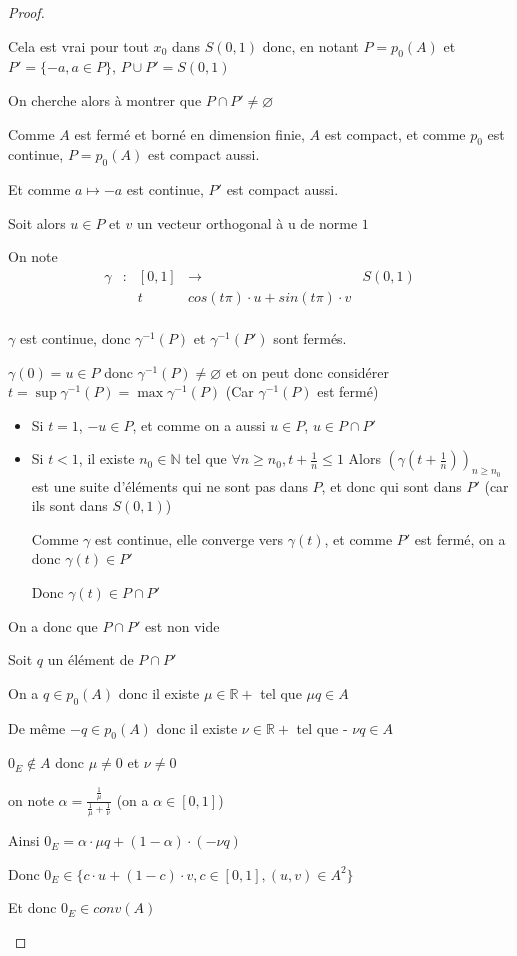 \documentclass[a4paper]{article}
\begin{document}
\begin{proof}
\begin{itemize}
Cela est vrai pour tout $x_{0}$ dans $S(0, 1)$ donc, en notant $P = p_{0}(A)$ et $P' = \{-a, a \in P \}$, $P \cup P' = S(0, 1)$

On cherche alors à montrer que $ P \cap P' \neq \varnothing$

Comme $A$ est fermé et borné en dimension finie, $A$ est compact, et comme $p_{0}$ est continue, $P = p_{0}(A)$ est compact aussi.

Et comme $a \mapsto -a$ est continue, $P'$ est compact aussi.

Soit alors $u \in P$ et $v$ un vecteur orthogonal à u de norme $1$

On note 
\[\begin{array}{ccccc}
\gamma & : & [0, 1] & \to & S(0, 1) \\
 & & t & cos(t\pi) \cdot u + sin(t\pi) \cdot v \\
\end{array}\]

$\gamma$ est continue, donc $\gamma^{-1}(P)$ et $\gamma^{-1}(P')$ sont fermés.

$\gamma(0) = u \in P$ donc $\gamma^{-1}(P) \neq \varnothing$ et on peut donc considérer $t = \sup \gamma^{-1}(P) = \max \gamma^{-1}(P)$ (Car $\gamma^{-1}(P)$ est fermé)

\begin{itemize}
\item Si $t = 1$, $-u \in P$, et comme on a aussi $u \in P$, $u \in P \cap P'$
\item Si $t < 1$, il existe $n_{0} \in \mathbb{N}$ tel que $\forall n \geqslant n_{0}, t + \frac{1}{n} \leqslant 1$
Alors $(\gamma(t + \frac{1}{n}))_{n \geqslant n_{0}}$ est une suite d'éléments qui ne sont pas dans $P$, et donc qui sont dans $P'$ (car ils sont dans $S(0, 1)$)


Comme $\gamma$ est continue, elle converge vers $\gamma(t)$, et comme $P'$ est fermé, on a donc $\gamma(t) \in P'$

Donc $\gamma(t) \in P \cap P'$
\end{itemize}

On a donc que $P \cap P'$ est non vide

Soit $q$ un élément de $P \cap P'$

On a $q \in p_{0}(A)$ donc il existe $\mu \in \mathbb{R}+$ tel que $\mu q \in A$

De même $-q \in p_{0}(A)$ donc il existe $\nu \in \mathbb{R}+$ tel que - $\nu q \in A$

$0_{E} \notin A$ donc $\mu \neq 0$ et $\nu \neq 0$

on note $\alpha = \frac{\frac{1}{\mu}}{\frac{1}{\mu} + \frac{1}{\nu}}$ (on a $\alpha \in [0, 1]$)

Ainsi $0_{E} = \alpha \cdot \mu q + (1 - \alpha) \cdot (- \nu  q)$

Donc $0_{E} \in \{c \cdot u + (1 - c) \cdot v, c \in [0, 1], (u, v) \in A^{2} \}$


Et donc $0_{E} \in conv(A)$
\end{itemize}
\end{proof}
\end{document}
